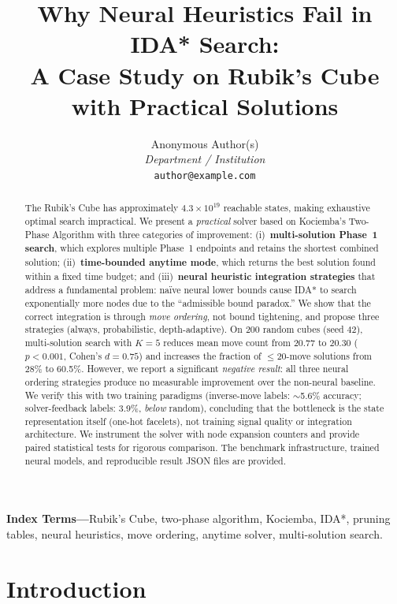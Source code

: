 \documentclass[10pt,twocolumn,a4paper]{article}
\title{\bf Why Neural Heuristics Fail in IDA* Search:\\ A Case Study on Rubik's Cube with Practical Solutions}
\author{Anonymous Author(s)\\ \textit{Department / Institution}\\ \texttt{author@example.com}}
\date{}
\begin{document}
\maketitle

\begin{abstract}
The Rubik's Cube has approximately $4.3 \times 10^{19}$ reachable states, making exhaustive optimal search impractical. We present a \emph{practical} solver based on Kociemba's Two-Phase Algorithm with three categories of improvement: (i)~\textbf{multi-solution Phase~1 search}, which explores multiple Phase~1 endpoints and retains the shortest combined solution; (ii)~\textbf{time-bounded anytime mode}, which returns the best solution found within a fixed time budget; and (iii)~\textbf{neural heuristic integration strategies} that address a fundamental problem: na\"ive neural lower bounds cause IDA* to search exponentially more nodes due to the ``admissible bound paradox.'' We show that the correct integration is through \emph{move ordering}, not bound tightening, and propose three strategies (always, probabilistic, depth-adaptive). On 200 random cubes (seed 42), multi-solution search with $K=5$ reduces mean move count from 20.77 to 20.30 ($p < 0.001$, Cohen's $d = 0.75$) and increases the fraction of $\leq$20-move solutions from 28\% to 60.5\%. However, we report a significant \emph{negative result}: all three neural ordering strategies produce no measurable improvement over the non-neural baseline. We verify this with two training paradigms (inverse-move labels: $\sim$5.6\% accuracy; solver-feedback labels: 3.9\%, \emph{below} random), concluding that the bottleneck is the state representation itself (one-hot facelets), not training signal quality or integration architecture. We instrument the solver with node expansion counters and provide paired statistical tests for rigorous comparison. The benchmark infrastructure, trained neural models, and reproducible result JSON files are provided.
\end{abstract}

\noindent\textbf{Index Terms---}Rubik's Cube, two-phase algorithm, Kociemba, IDA*, pruning tables, neural heuristics, move ordering, anytime solver, multi-solution search.
\vspace{0.5em}

\section{Introduction}
\label{sec:intro}
\end{document}
